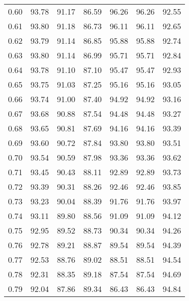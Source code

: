 \begin{tabular}{|c|c|c|c|c|c|c|}
      0.60 &     93.78 &     91.17 &      86.59 &   96.26 &      96.26 &         92.55 \\
      0.61 &     93.80 &     91.18 &      86.73 &   96.11 &      96.11 &         92.65 \\
      0.62 &     93.79 &     91.14 &      86.85 &   95.88 &      95.88 &         92.74 \\
      0.63 &     93.80 &     91.14 &      86.99 &   95.71 &      95.71 &         92.84 \\
      0.64 &     93.78 &     91.10 &      87.10 &   95.47 &      95.47 &         92.93 \\
      0.65 &     93.75 &     91.03 &      87.25 &   95.16 &      95.16 &         93.05 \\
      0.66 &     93.74 &     91.00 &      87.40 &   94.92 &      94.92 &         93.16 \\
      0.67 &     93.68 &     90.88 &      87.54 &   94.48 &      94.48 &         93.27 \\
      0.68 &     93.65 &     90.81 &      87.69 &   94.16 &      94.16 &         93.39 \\
      0.69 &     93.60 &     90.72 &      87.84 &   93.80 &      93.80 &         93.51 \\
      0.70 &     93.54 &     90.59 &      87.98 &   93.36 &      93.36 &         93.62 \\
      0.71 &     93.45 &     90.43 &      88.11 &   92.89 &      92.89 &         93.73 \\
      0.72 &     93.39 &     90.31 &      88.26 &   92.46 &      92.46 &         93.85 \\
      0.73 &     93.23 &     90.04 &      88.39 &   91.76 &      91.76 &         93.97 \\
      0.74 &     93.11 &     89.80 &      88.56 &   91.09 &      91.09 &         94.12 \\
      0.75 &     92.95 &     89.52 &      88.73 &   90.34 &      90.34 &         94.26 \\
      0.76 &     92.78 &     89.21 &      88.87 &   89.54 &      89.54 &         94.39 \\
      0.77 &     92.53 &     88.76 &      89.02 &   88.51 &      88.51 &         94.54 \\
      0.78 &     92.31 &     88.35 &      89.18 &   87.54 &      87.54 &         94.69 \\
      0.79 &     92.04 &     87.86 &      89.34 &   86.43 &      86.43 &         94.84 \\

\end{tabular}
